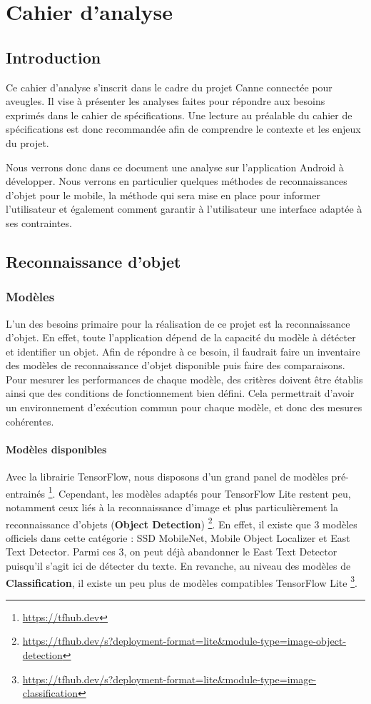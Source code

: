 \documentclass[UTF8]{EPURapport}
\begin{document}
\chapter{Cahier d'analyse}

\section{Introduction}
Ce cahier d'analyse s'inscrit dans le cadre du projet Canne connectée pour aveugles. Il vise à présenter les analyses faites pour répondre aux besoins exprimés dans le cahier de spécifications. Une lecture au préalable du cahier de spécifications est donc recommandée afin de comprendre le contexte et les enjeux du projet.

Nous verrons donc dans ce document une analyse sur l'application Android à développer. Nous verrons en particulier quelques méthodes de reconnaissances d'objet pour le mobile, la méthode qui sera mise en place pour informer l'utilisateur et également comment garantir à l'utilisateur une interface adaptée à ses contraintes.

\section{Reconnaissance d'objet}
\subsection{Modèles}
L'un des besoins primaire pour la réalisation de ce projet est la reconnaissance d'objet. En effet, toute l’application dépend de la capacité du modèle à détécter et identifier un objet. Afin de répondre à ce besoin, il faudrait faire un inventaire des modèles de reconnaissance d'objet disponible puis faire des comparaisons. Pour mesurer les performances de chaque modèle, des critères doivent être établis ainsi que des conditions de fonctionnement bien défini. Cela permettrait d'avoir un environnement d'exécution commun pour chaque modèle, et donc des mesures cohérentes.

\subsubsection{Modèles disponibles}
Avec la librairie TensorFlow, nous disposons d'un grand panel de modèles pré-entrainés \footnote{\url{https://tfhub.dev}}. Cependant, les modèles adaptés pour TensorFlow Lite restent peu, notamment ceux liés à la reconnaissance d'image et plus particulièrement la reconnaissance d'objets (\textbf{Object Detection}) \footnote{\url{https://tfhub.dev/s?deployment-format=lite&module-type=image-object-detection}}. En effet, il existe que 3 modèles officiels dans cette catégorie : SSD MobileNet, Mobile Object Localizer et East Text Detector. Parmi ces 3, on peut déjà abandonner le East Text Detector puisqu'il s'agit ici de détecter du texte. En revanche, au niveau des modèles de \textbf{Classification}, il existe un peu plus de modèles compatibles TensorFlow Lite \footnote{\url{https://tfhub.dev/s?deployment-format=lite&module-type=image-classification}}.
\end{document}
